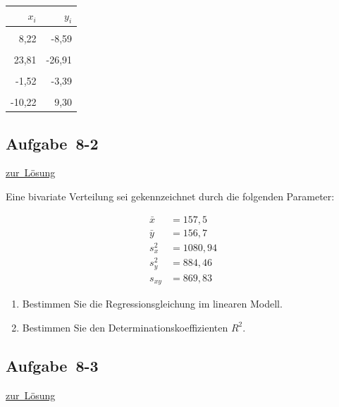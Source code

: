 \documentclass[
  11pt,
  ngerman,
  a4paper,
]{report}
\begin{document}
\begin{table}
\centering
\begin{tabular}{rr}
\toprule
\textbf{$x_i$} & \textbf{$y_i$}\\
\midrule
\cellcolor{gray!6}{-11,49} & \cellcolor{gray!6}{6,82}\\
8,22 & -8,59\\
\cellcolor{gray!6}{-25,66} & \cellcolor{gray!6}{25,92}\\
23,81 & -26,91\\
\cellcolor{gray!6}{-3,14} & \cellcolor{gray!6}{4,41}\\
-1,52 & -3,39\\
\cellcolor{gray!6}{20,15} & \cellcolor{gray!6}{-19,89}\\
-10,22 & 9,30\\
\bottomrule
\end{tabular}
\end{table}

\hypertarget{aufgabe-8-2}{%
\subsection{Aufgabe~8-2}\label{aufgabe-8-2}}

\protect\hyperlink{loesung-8-2}{zur~Lösung}

Eine bivariate Verteilung sei gekennzeichnet durch die folgenden Parameter:

\[
\begin{aligned}
\bar{x}&=157,5\\
\bar{y}&=156,7\\
s^2_{x}&=1080,94\\
s^2_{y}&=884,46\\
s_{xy}&=869,83
\end{aligned}
\]

\begin{enumerate}
\def\labelenumi{\alph{enumi})}
\item
  Bestimmen Sie die Regressionsgleichung im linearen Modell.
\item
  Bestimmen Sie den Determinationskoeffizienten \(R^2\).
\end{enumerate}

\hypertarget{aufgabe-8-3}{%
\subsection{Aufgabe~8-3}\label{aufgabe-8-3}}

\protect\hyperlink{loesung-8-3}{zur~Lösung}
\end{document}
